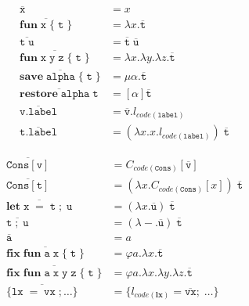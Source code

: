 \begin{figure}
  \begin{minipage}{0.5\textwidth}
  \begin{align*}
    \overline{\mathtt{x}}
      &= x\\[1mm]
    \overline{\mathtt{\mathbf{fun}\;x\;\{\;t\;\}}}
      &= \lambda x.\overline{\mathtt{t}}\\[1mm]
    \overline{\mathtt{t\;u}}
      &= \overline{\mathtt{t}}\;\overline{\mathtt{u}}\;\\[1mm]
    \overline{\mathtt{\mathbf{fun}\;x\;y\;z\;\{\;t\;\}}}
      &= \lambda x.\lambda y.\lambda z.\overline{\mathtt{t}}\\[1mm]
    \overline{\mathtt{\mathbf{save}\;alpha\;\{\;t\;\}}}
      &= \mu \alpha.\overline{\mathtt{t}}\\[1mm]
    \overline{\mathtt{\mathbf{restore}\;alpha\;t}}
      &= [\alpha]\overline{\mathtt{t}}\\[1mm]
    \overline{\mathtt{v.label}}
      &= \overline{\mathtt{v}}.l_{code(\mathtt{label})}\\[1mm]
    \overline{\mathtt{t.label}}
      &= (\lambda x.x.l_{code(\mathtt{label})})\;\overline{\mathtt{t}}
  \end{align*}
  \end{minipage}
  \begin{minipage}{0.5\textwidth}
  \begin{align*}
    \overline{\mathtt{Cons[v]}}
      &= C_{code(\mathtt{Cons})}[\overline{\mathtt{v}}]\\[1mm]
    \overline{\mathtt{Cons[t]}}
      &= (\lambda x.C_{code(\mathtt{Cons})}[x])\;\overline{\mathtt{t}}\\[1mm]
    \overline{\mathtt{\mathbf{let}\;x\;=\;t\;;\;u}}
      &= (\lambda x.\overline{\mathtt{u}})\;\overline{\mathtt{t}}\\[1mm]
    \overline{\mathtt{t\;;\;u}}
      &= (\lambda {-}.\overline{\mathtt{u}})\;\overline{\mathtt{t}}\\[1mm]
    \overline{\mathtt{a}}
      &= a\\[1mm]
    \overline{\mathtt{\mathbf{fix}\;\mathbf{fun}\;a\;x\;\{\;t\;\}}}
      &= \varphi a.\lambda x.\overline{\mathtt{t}}\\[1mm]
    \overline{\mathtt{\mathbf{fix}\;\mathbf{fun}\;a\;x\;y\;z\;\{\;t\;\}}}
      &= \varphi a.\lambda x.\lambda y.\lambda z.\overline{\mathtt{t}}\\[1mm]
    \overline{\mathtt{\{lx\;=\;vx\;;\dots\}}}
      &= \{l_{code(\mathbf{lx})} = \overline{\mathtt{vx}}; \;\dots\}

\end{align*}
\end{minipage}
\end{figure}

